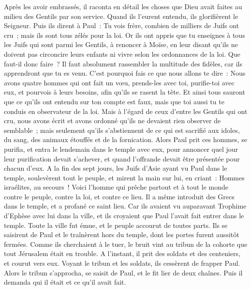 \begin{multicols}{2}
Après les avoir embrassés, il raconta en détail les choses que Dieu avait faites au milieu des Gentils par son service.
Quand ils l'eurent entendu, ils glorifièrent le Seigneur. Puis ils dirent à Paul~: Tu vois frère, combien de milliers de Juifs ont cru~; mais ils sont tous zélés pour la loi.
Or ils ont appris que tu enseignes à tous les Juifs qui sont parmi les Gentils, à renoncer à Moïse, en leur disant qu'ils ne doivent pas circoncire leurs enfants ni vivre selon les ordonnances de la loi.
Que faut-il donc faire~? Il faut absolument rassembler la multitude des fidèles, car ils apprendront que tu es venu.
C'est pourquoi fais ce que nous allons te dire~: Nous avons quatre hommes qui ont fait un vœu,
prends-les avec toi, purifie-toi avec eux, et pourvois à leurs besoins, afin qu'ils se rasent la tête. Et ainsi tous sauront que ce qu'ils ont entendu sur ton compte est faux, mais que toi aussi tu te conduis en observateur de la loi.
Mais à l’égard de ceux d’entre les Gentils qui ont cru, nous avons écrit et avons ordonné qu’ils ne devaient rien observer de semblable~; mais seulement qu’ils s’abstiennent de ce qui est sacrifié aux idoles, du sang, des animaux étouffés et de la fornication.
Alors Paul prit ces hommes, se purifia, et entra le lendemain dans le temple avec eux, pour annoncer quel jour leur purification devait s'achever, et quand l'offrande devait être présentée pour chacun d'eux.
A la fin des sept jours, les Juifs d'Asie ayant vu Paul dans le temple, soulevèrent tout le peuple, et mirent la main sur lui,
en criant~: Hommes israélites, au secours~! Voici l'homme qui prêche partout et à tout le monde contre le peuple, contre la loi, et contre ce lieu. Il a même introduit des Grecs dans le temple, et a profané ce saint lieu.
Car ils avaient vu auparavant Trophime d'Ephèse avec lui dans la ville, et ils croyaient que Paul l'avait fait entrer dans le temple.
Toute la ville fut émue, et le peuple accourut de toutes parts. Ils se saisirent de Paul et le traînèrent hors du temple, dont les portes furent aussitôt fermées.
Comme ils cherchaient à le tuer, le bruit vint au tribun de la cohorte que tout Jérusalem était en trouble.
A l'instant, il prit des soldats et des centeniers, et courut vers eux. Voyant le tribun et les soldats, ils cessèrent de frapper Paul.
Alors le tribun s'approcha, se saisit de Paul, et le fit lier de deux chaînes. Puis il demanda qui il était et ce qu'il avait fait.

\end{multicols}
